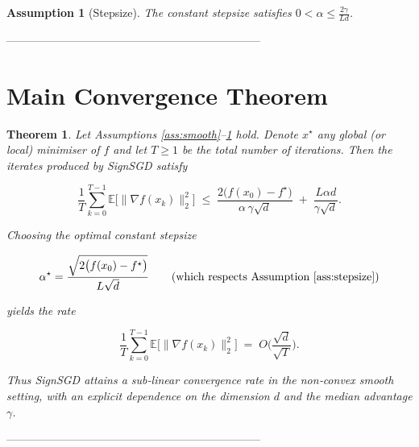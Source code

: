 \documentclass{article}
\newtheorem{theorem}{Theorem}
\newtheorem{assumption}{Assumption}
\begin{document}
\begin{assumption}[Stepsize]\label{ass:stepsize}
The constant stepsize satisfies $0<\alpha\le \frac{2\gamma}{L d}$.
\end{assumption}

--------------------------------------------------------------------

\section*{Main Convergence Theorem}
\begin{theorem}\label{thm:main}
Let Assumptions \ref{ass:smooth}–\ref{ass:stepsize} hold.
Denote $x^{\star}$ any global (or local) minimiser of $f$ and let
$T\ge1$ be the total number of iterations.
Then the iterates produced by SignSGD satisfy  

\[
\frac{1}{T}\sum_{k=0}^{T-1}
\mathbb{E}\!\big[\|\nabla f(x_k)\|_{2}^{2}\big]
\;\le\;
\frac{2\big(f(x_{0})-f^{\star}\big)}{\alpha\,\gamma\sqrt{d}}
\;+\;
\frac{L\alpha d}{\gamma\sqrt{d}} .
\tag{1}
\]

Choosing the optimal constant stepsize  

\[
\alpha^{\star}= \frac{\sqrt{2\big(f(x_{0})-f^{\star}\big)}}{L\sqrt{d}}
\qquad (\text{which respects Assumption \ref{ass:stepsize}})
\]

yields the rate  

\[
\frac{1}{T}\sum_{k=0}^{T-1}
\mathbb{E}\!\big[\|\nabla f(x_k)\|_{2}^{2}\big]
\;=\;O\!\Big(\frac{\sqrt{d}}{\sqrt{T}}\Big).
\tag{2}
\]

Thus SignSGD attains a sub‑linear convergence rate in the non‑convex
smooth setting, with an explicit dependence on the dimension $d$ and the
median advantage $\gamma$.
\end{theorem}

--------------------------------------------------------------------
\end{document}
